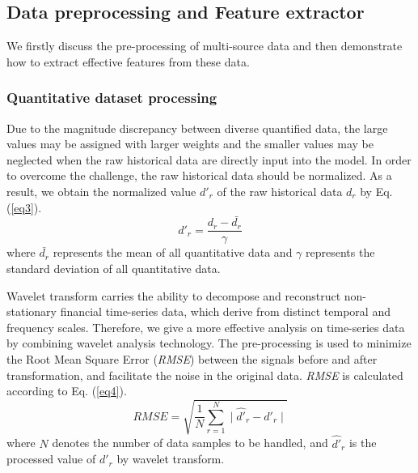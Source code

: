 \documentclass[sn-mathphys]{sn-jnl}%
\theoremstyle{thmstyleone}%
\theoremstyle{thmstyletwo}%
\theoremstyle{thmstylethree}%
\begin{document}
\subsection{Data preprocessing and Feature extractor}\label{Data preprocessing and Feature extractor}
We firstly discuss the pre-processing of multi-source data and then demonstrate how to extract effective features from these data.
\subsubsection{Quantitative dataset processing}\label{Quantitative dataset processing}
Due to the magnitude discrepancy between diverse quantified data, the large values may be assigned with larger weights and the smaller values may be neglected when the raw historical data are directly input into the model. In order to overcome the challenge, the raw historical data should be normalized. As a result, we obtain the normalized value $d'_r$ of the raw historical data $d_r$ by Eq. (\ref{eq3}).
\begin{equation}
d'_r=\frac{d_r-\bar{d_r}}{\gamma}  \label{eq3}
\end{equation}
where $\bar{d_r}$ represents the mean of all quantitative data and $\gamma$ represents the standard deviation of all quantitative data.

Wavelet transform carries the ability to decompose and reconstruct non-stationary financial time-series data, which derive from distinct temporal and frequency scales. Therefore, we give a more effective analysis on time-series data by combining wavelet analysis technology. The pre-processing is used to minimize the Root Mean Square Error (\emph{RMSE}) between the signals before and after transformation, and facilitate the noise in the original data. \emph{RMSE} is calculated according to Eq. (\ref{eq4}).
\begin{equation}
R M S E=\sqrt{\frac{1}{N} \sum_{r=1}^N\mid\widehat{d'}_r-d'_r\mid}                      \label{eq4}
\end{equation}
where $N$ denotes the number of data samples to be handled, and $\widehat{d'}_r$ is the processed value of $d'_r$ by wavelet transform.
\end{document}

